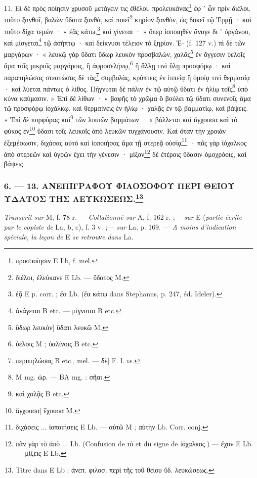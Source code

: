 \documentclass[a4paper, 11pt, oneside, polutonikogreek, french]{article}
\begin{document}
11. Εἰ δὲ πρὸς ποίησιν χρυσοῦ μετάγειν τις ἐθέλοι, προλευκάνας\footnote{προσποίησιν E Lb, f. mel.} ἐφ ᾽ ὧν πρὶν διέλοι, τοῦτο ξανθοῖ, βαλὼν ὕδατα ξανθὰ, καὶ ποιεῖ\footnote{διέλοι, ἐλεύκανε E Lb. --- ὕδατος M.} κηρίον ξανθὸν, ὡς δοκεῖ τῷ Ἑρμῇ · καὶ τοῦτο δίχα τεμών · « ἐᾶς κάτω,\footnote{ἐᾷ E p. corr. ; ἔα Lb. (ἔα κάτω dans Stephanus, p. 247, éd. Ideler).} καὶ γίνεται · » ὅπερ ἰοποιηθὲν ἄναγε δι ᾽ ὀργάνου, καὶ μίσγεται\footnote{ἀνάγεται B etc. --- μίγνυται B etc.} τῷ ἀσήπτῳ · καὶ δείκνυσι τέλειον τὸ ξηρίον. Ἐ- (f. 127 v.) πὶ δὲ τῶν μαργάρων · « λευκῷ γὰρ ὕδατι ὕδωρ λευκὸν προσβαλὼν, χαλᾶς\footnote{ὕδωρ λευκὸν] ὕδατι λευκῶ M.} ἐν ἄγγεσιν ὑελοῖς ἅμα τοῖς μικροῖς μαργάροις, ἢ ἀφροσελήνῳ,\footnote{ὑέλοις M ; ὑαλίνοις B etc.} ἢ ἄλλῃ τινὶ ὕλῃ προσφόρῳ · καὶ παραπηλώσας στεατώσας δὲ τὰς\footnote{περιπηλώσας B etc., mel. --- δὲ] F. l. τε.} συμβολὰς, κρύπτεις ἐν ἰππείᾳ ἢ ὁμοίᾳ τινὶ θερμασίᾳ · καὶ λύεται πάντως ὁ λίθος. Πήγνυται δὲ πάλιν ἐν τῷ αὐτῷ ὕδατι ἐν ἡλίῳ τοῖς\footnote{M mg. ὡρ. --- BA mg. : σῆαι.} ὑπὸ κύνα καύμασιν. » Ἐπὶ δὲ λίθων · « βαφῆς τὸ χρῶμα ὃ βούλει τῷ ὕδατι συνενοῖς ἅμα τῷ προσφόρῳ ἰοχάλκῳ, καὶ θερμαίνεις ἐν ἡλίῳ · χαλᾷς ἐν τῷ βαμματίῳ, καὶ βάψεις. » Ἐπὶ δὲ πορφύρας καὶ\footnote{καὶ χαλᾷς B etc.} τῶν λοιπῶν βαμμάτων · « βάλλεται καὶ ἄγχουσα καὶ τὸ φύκος ἐν\footnote{ἄγχουσα] ἔχουσα M.} ὕδασι τοῖς λευκοῖς ἀπὸ λευκῶν τυγχάνουσιν. Καὶ ὅταν τὴν χροιὰν ἐξεμέσωσιν, διχάσας αὐτὸ καὶ ἰοποιήσας ἅμα τῇ στερεᾷ οὐσίᾳ\footnote{διχάσεις ... ἰοποιήσεις E Lb. --- αὐτῶ M ; αὐτὴν Lb. Corr. conj.} · πᾶς γὰρ ἰόχαλκος ἀπὸ στερεῶν καὶ ὑγρῶν ἔχει τὴν γένεσιν · μίξον\footnote{πᾶν γὰρ τὸ ἀπὸ ... Lb. (Confusion de τὸ et du signe de ἰόχαλκος.) --- ἔχον E Lb. --- μίξεις E Lb.} δὲ ἑτέροις ὕδασιν ὁμοχρόοις, καὶ βάψεις.

\bigskip
\centerline{\EightStarTaper}
\centerline{\EightStarTaper\EightStarTaper}
\bigskip

\subsubsection[6. --- 13. ΑΝΕΠΙΓΡΑΦΟΥ ΦΙΛΟΣΟΦΟΥ ΠΕΡΙ ΘΕΙΟΥ ΥΔΑΤΟΣ ΤΗΣ ΛΕΥΚΩΣΕΩΣ.]{6. --- 13. ΑΝΕΠΙΓΡΑΦΟΥ ΦΙΛΟΣΟΦΟΥ ΠΕΡΙ ΘΕΙΟΥ ΥΔΑΤΟΣ ΤΗΣ ΛΕΥΚΩΣΕΩΣ.\footnote{Titre dans E Lb : ἀνεπ. φιλοσ. περὶ τῆς τοῦ θείου ὕδ. λευκώσεως.}}

\emph{Transcrit sur} M, f. 78 r. --- \emph{Collationné sur} A, f. 162 r. ;--- \emph{sur} E (\emph{partie écrite par le copiste de} La, b, c), f. 3 v. ;--- \emph{sur} La, p. 169. --- \emph{A moins d'indication spéciale, la leçon de} E \emph{se retrouνe dans} La.
\end{document}
